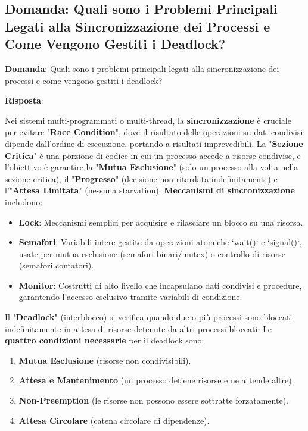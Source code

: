 
\subsection*{Domanda: Quali sono i Problemi Principali Legati alla Sincronizzazione dei Processi e Come Vengono Gestiti i Deadlock?}

\textbf{Domanda}: Quali sono i problemi principali legati alla sincronizzazione dei processi e come vengono gestiti i deadlock?

\textbf{Risposta}:

Nei sistemi multi-programmati o multi-thread, la \textbf{sincronizzazione} è cruciale per evitare "\textbf{Race Condition}", dove il risultato delle operazioni su dati condivisi dipende dall'ordine di esecuzione, portando a risultati imprevedibili. La "\textbf{Sezione Critica}" è una porzione di codice in cui un processo accede a risorse condivise, e l'obiettivo è garantire la "\textbf{Mutua Esclusione}" (solo un processo alla volta nella sezione critica), il "\textbf{Progresso}" (decisione non ritardata indefinitamente) e l'"\textbf{Attesa Limitata}" (nessuna starvation).
\textbf{Meccanismi di sincronizzazione} includono:
\begin{itemize}
    \item \textbf{Lock}: Meccanismi semplici per acquisire e rilasciare un blocco su una risorsa.
    \item \textbf{Semafori}: Variabili intere gestite da operazioni atomiche `wait()` e `signal()`, usate per mutua esclusione (semafori binari/mutex) o controllo di risorse (semafori contatori).
    \item \textbf{Monitor}: Costrutti di alto livello che incapsulano dati condivisi e procedure, garantendo l'accesso esclusivo tramite variabili di condizione.
\end{itemize}
Il "\textbf{Deadlock}" (interblocco) si verifica quando due o più processi sono bloccati indefinitamente in attesa di risorse detenute da altri processi bloccati. Le \textbf{quattro condizioni necessarie} per il deadlock sono:
\begin{enumerate}
    \item \textbf{Mutua Esclusione} (risorse non condivisibili).
    \item \textbf{Attesa e Mantenimento} (un processo detiene risorse e ne attende altre).
    \item \textbf{Non-Preemption} (le risorse non possono essere sottratte forzatamente).
    \item \textbf{Attesa Circolare} (catena circolare di dipendenze).
\end{enumerate}

